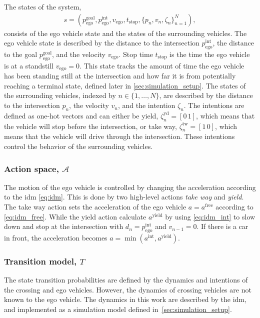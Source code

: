 The states of the system,
\begin{align}
    s = (p_\mathrm{ego}^\mathrm{goal},p_\mathrm{ego}^\mathrm{int}, v_\mathrm{ego}, t_\mathrm{stop}, \{p_{n}, v_n, \zeta_n\}_{n=1}^N),
    \label{eq:state}
\end{align}
consists of the ego vehicle state and the states of the surrounding vehicles. The ego vehicle state is described by the distance to the intersection $p_\mathrm{ego}^\mathrm{int}$, the distance to the goal $p_\mathrm{ego}^\mathrm{goal}$, and the velocity $v_\mathrm{ego}$. Stop time $t_\mathrm{stop}$ is the time the ego vehicle is at a standstill $v_\mathrm{ego}=0$. This state tracks the amount of time the ego vehicle has been standing still at the intersection and how far it is from potentially reaching a terminal state, defined later in \ref{sec:simulation_setup}. The states of the surrounding vehicles, indexed by $n \in \{1, \ldots, N\}$, are described by the distance to the intersection $p_{n}$, the velocity $v_n$, and the intention $\zeta_n$. The intentions are defined as one-hot vectors and can either be yield, $\zeta_n^\mathrm{yd} = [0 \, 1]$, which means that the vehicle will stop before the intersection, or take way, $\zeta_n^\mathrm{tw}= [1 \, 0]$, which means that the vehicle will drive through the intersection. These intentions control the behavior of the surrounding vehicles.


\subsubsection{Action space, $\mathcal{A}$}
\label{sec:action}
The motion of the ego vehicle is controlled by changing the acceleration according to the \gls{idm} \eqref{eq:idm}. This is done by two high-level actions \textit{take way} and \textit{yield}. The take way action sets the acceleration of the ego vehicle $a=a^\mathrm{free}$ according to \eqref{eq:idm_free}. While the yield action calculate $a^\mathrm{yield}$ by using \eqref{eq:idm_int} to slow down and stop at the intersection with $d_n = p_\mathrm{ego}^\mathrm{int}$ and $v_{n-1}=0$. If there is a car in front, the acceleration becomes $a=\min(a^\mathrm{int},a^\mathrm{yield})$. 

\subsubsection{Transition model, $T$}
\label{sec:transition_model}
The state transition probabilities are defined by the dynamics and intentions of the crossing and ego vehicles. However, the dynamics of crossing vehicles are not known to the ego vehicle. The dynamics in this work are described by the \gls{idm}, and implemented as a simulation model defined in~\ref{sec:simulation_setup}. 

